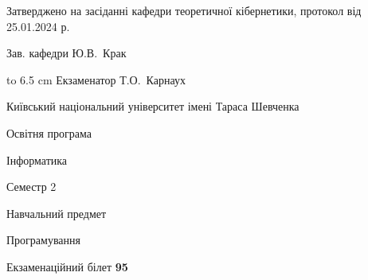 \documentclass[12pt, ukrainian]{article}
\begin{document}
{\smallskip\smallskip \begin {scriptsize} Затверджено на засіданні кафедри теоретичної кібернетики, протокол   від   25.01.2024 р.\par\smallskip\smallskip\smallskip\smallskip
{\parbox {6.5 cm} {Зав. кафедри \dotfill Ю.В.~Крак}}\hspace {0.7cm} {\hbox to 6.5 cm { Екзаменатор \dotfill Т.О.~Карнаух}} \end{scriptsize}}
\newpage
{{\begin {scriptsize}\par
{ \center  Київський національний університет імені Тараса Шевченка \par}
{\parbox {5 cm}{Освітня програма \hfill}{\parbox {7 cm}{Інформатика\hfill}}\parbox {6 cm}{\hfill Семестр 2}}\par
{\parbox {5 cm} {Навчальний предмет \hfill}\parbox {7 cm}{Програмування \hfill}\parbox {6cm}{\hfill}\par}\vspace{-15pt} \end{scriptsize}}{\center Екзаменаційний білет \No \textbf { 95 }\par}}
\end{document}
